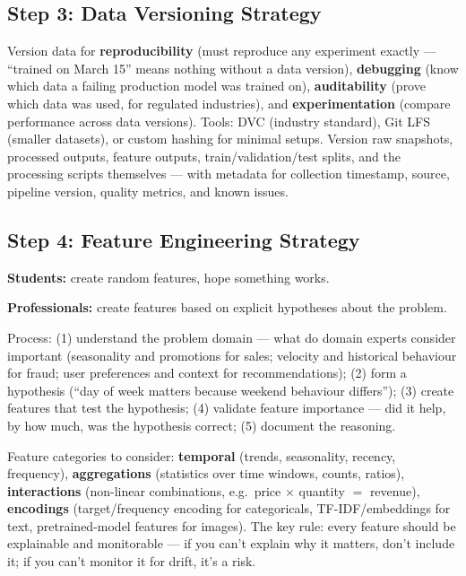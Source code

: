 \subsection{Step 3: Data Versioning Strategy}

Version data for \textbf{reproducibility} (must reproduce any experiment exactly --- ``trained on March 15'' means
nothing without a data version), \textbf{debugging} (know which data a failing production model was trained on),
\textbf{auditability} (prove which data was used, for regulated industries), and \textbf{experimentation}
(compare performance across data versions). Tools: DVC (industry standard), Git LFS (smaller datasets), or custom
hashing for minimal setups. Version raw snapshots, processed outputs, feature outputs, train/validation/test
splits, and the processing scripts themselves --- with metadata for collection timestamp, source, pipeline
version, quality metrics, and known issues.

\subsection{Step 4: Feature Engineering Strategy}

\begin{example}
\bad \textbf{Students:} create random features, hope something works.

\good \textbf{Professionals:} create features based on explicit hypotheses about the problem.
\end{example}

Process: (1) understand the problem domain --- what do domain experts consider important (seasonality and
promotions for sales; velocity and historical behaviour for fraud; user preferences and context for
recommendations); (2) form a hypothesis (``day of week matters because weekend behaviour differs''); (3) create
features that test the hypothesis; (4) validate feature importance --- did it help, by how much, was the
hypothesis correct; (5) document the reasoning.

Feature categories to consider: \textbf{temporal} (trends, seasonality, recency, frequency), \textbf{aggregations}
(statistics over time windows, counts, ratios), \textbf{interactions} (non-linear combinations, e.g.\ price
$\times$ quantity $=$ revenue), \textbf{encodings} (target/frequency encoding for categoricals, TF-IDF/embeddings
for text, pretrained-model features for images). The key rule: every feature should be explainable and
monitorable --- if you can't explain why it matters, don't include it; if you can't monitor it for drift, it's a
risk.


